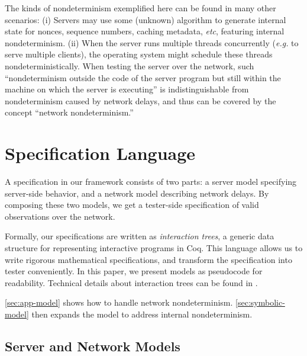 The kinds of nondeterminism exemplified here can be found in many other
scenarios: (i) Servers may use some (unknown) algorithm to generate internal
state for nonces, sequence numbers, caching metadata, {\it etc}, featuring
internal nondeterminism.  (ii) When the server runs multiple threads
concurrently ({\it e.g.} to serve multiple clients), the operating system might
schedule these threads nondeterministically.  When testing the server over the
network, such ``nondeterminism outside the code of the server program but still
within the machine on which the server is executing'' is indistinguishable from
nondeterminism caused by network delays, and thus can be covered by the concept
``network nondeterminism.''


\section{Specification Language}
\label{sec:spec-language}
A specification in our framework consists of two parts: a server model
specifying
server-side behavior,
and a network model describing network
delays.  By
composing these two models, we get a tester-side specification of valid
observations over the network.

Formally, our specifications are written as {\em interaction trees}, a generic
data structure for representing interactive programs in Coq.  This language
allows us to write rigorous mathematical specifications, and transform the
specification into tester conveniently.  In this
paper, we present models as pseudocode for readability.  Technical details
about interaction trees can be found in \cite{itree}.

\autoref{sec:app-model} shows how to handle network nondeterminism.
\autoref{sec:symbolic-model} then expands the model to address internal
nondeterminism.

\subsection{Server and Network Models}
\label{sec:app-model}


